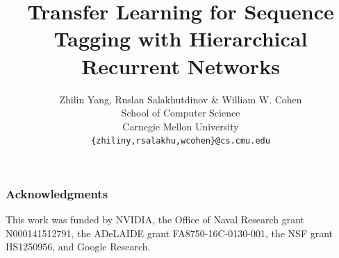 \documentclass{article} %
\title{Transfer Learning for Sequence Tagging with Hierarchical Recurrent Networks}
\author{Zhilin Yang, Ruslan Salakhutdinov \& William W. Cohen \\
School of Computer Science\\
Carnegie Mellon University\\
\texttt{\{zhiliny,rsalakhu,wcohen\}@cs.cmu.edu}
}
\begin{document}
\maketitle








\subsubsection*{Acknowledgments}

This work was funded by NVIDIA, the Office of Naval Research grant N000141512791, the ADeLAIDE grant FA8750-16C-0130-001, the NSF grant IIS1250956, and Google Research.

\small



\end{document}
